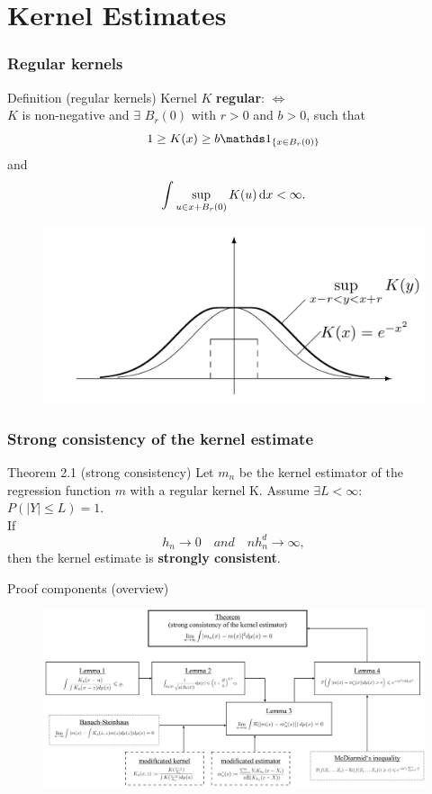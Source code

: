 
\section{Kernel Estimates}

\begin{frame}
\frametitle{Regular kernels}

\begin{block}{Definition (regular kernels)}
Kernel $K$ \textbf{regular}: $\Longleftrightarrow$ \\
$K$ is non-negative and $\exists$ $B_r(0)$ with $r>0$ and $b>0$, such that \[ 1 \geq K(x) \geq b \ind{\{x \in B_r(0)\}} \] and \[\int \sup\limits_{u \in x+B_r(0)} K(u) \mathop{}\!\mathrm{d}{x} < \infty. \]
\end{block}
\begin{figure}
    \includegraphics[scale=0.085]{regularKernelFigure.jpeg}
    \centering
\end{figure}
\end{frame}

\begin{frame}
\frametitle{Strong consistency of the kernel estimate}
\begin{alertblock}{Theorem 2.1 (strong consistency)}
Let $m_n$ be the kernel estimator of the regression function $m$ with a regular kernel K. Assume $\exists L<\infty$: $P(|Y| \leq L) = 1.$ \\ If \[h_n \to 0 \quad and \quad nh_n^d \to \infty,\] then the kernel estimate is \textbf{strongly consistent}.
\end{alertblock}
\end{frame}

\begin{frame}{Proof components (overview)}
\begin{figure}
    \includegraphics[scale=0.11]{organigramkernel.jpeg}
    \centering
\end{figure}
\end{frame}

